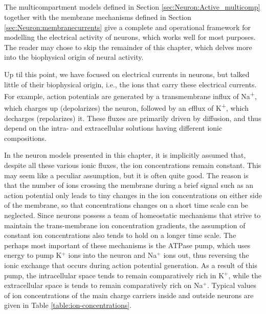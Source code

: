 


\subsection{}
\label{sec:Neuron:Ions_and_reversals}
The multicompartment models defined in Section \ref{sec:Neuron:Active_multicomp} together with the membrane mechanisms defined in Section \ref{sec:Neuron:membranecurrents} give a complete and operational framework for modelling the electrical activity of neurons, which works well for most purposes. The reader may chose to skip the remainder of this chapter, which delves more into the biophysical origin of neural activity. 

Up til this point, we have focused on electrical currents in neurons, but talked little of their biophysical origin, i.e., the ions that carry these electrical currents. For example, action potentials are generated by a transmembrane influx of Na\textsuperscript{+}, which charges up (depolarizes) the neuron, followed by an efflux of K\textsuperscript{+}, which decharges (repolarizes) it. These fluxes are primarily driven by diffusion, and thus depend on the intra- and extracellular solutions having different ionic compositions. 

In the neuron models presented in this chapter, it is implicitly assumed that, despite all these various ionic fluxes, the ion concentrations remain constant. This may seem like a peculiar assumption, but it is often quite good. The reason is that the number of ions crossing the membrane during a brief signal such as an action potential only leads to tiny changes in the ion concentrations on either side of the membrane, so that concentrations changes on a short time scale can be neglected. Since neurons possess a team of homeostatic mechanisms that strive to maintain the trans-membrane ion concentration gradients, the
assumption of constant ion concentrations also tends to hold on a longer time scale.  The perhaps most important of these mechanisms is the ATPase pump, which uses energy to pump K$^+$ ions into the neuron and Na$^+$ ions out, thus reversing the ionic exchange that occurs during action potential generation. As a result of this pump, the intracellular space tends to remain comparatively rich in K$^+$, while the extracellular space is tends to remain comparatively rich on Na$^+$. Typical values of ion concentrations of the main charge carriers inside and outside neurons are given in Table \ref{table:ion-concentrations}. 

